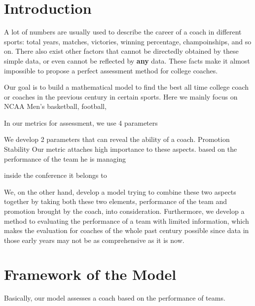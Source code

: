 
\section{Introduction}
A lot of numbers are usually used to describe the career of a coach in different sports: total years, matches, victories, winning percentage, champoinships, and so on. There also exist other factors that cannot be directedly obtained by these simple data, or even cannot be reflected by \textbf{any} data. These facts make it almost impossible to propose a perfect assessment method for college coaches.



Our goal is to build a mathematical model to find the best all time college coach or coaches in the previous century in certain sports. Here we mainly focus on NCAA Men's basketball, football, 

In our metrics for assessment, we use 4 parameters 

We develop 2 parameters that can reveal the ability of a coach. Promotion   Stability      Our metric attaches high importance to these aspects.   based on the performance of the team he is managing



 inside the conference it belongs to

We, on the other hand, develop a model trying to combine these two aspects together by taking both these two elements, performance of the team and promotion brought by the coach, into consideration. Furthermore, we develop a method to evaluating the performance of a team with limited information, which makes the evaluation for coaches of the whole past century possible since data in those early years may not be as comprehensive as it is now.




\section{Framework of the Model}
Basically, our model assesses a coach based on the performance of teams.












